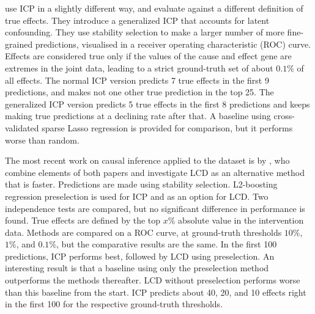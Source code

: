 \textbf{\citet{meinshausen2016methods}} use ICP in a slightly different way, and evaluate against a different definition of true effects. They introduce a generalized ICP that accounts for latent confounding. They use stability selection\citep{meinshausen2010stability} to make a larger number of more fine-grained predictions, visualised in a receiver operating characteristic (ROC) curve. Effects are considered true only if the values of the cause and effect gene are extremes in the joint data, leading to a strict ground-truth set of about $0.1\%$ of all effects. The normal ICP version predicts 7 true effects in the first 9 predictions, and makes not one other true prediction in the top 25. The generalized ICP version predicts 5 true effects in the first 8 predictions and keeps making true predictions at a declining rate after that. A baseline using cross-validated sparse Lasso regression is provided for comparison, but it performs worse than random.

The most recent work on causal inference applied to the \citet{kemmeren2014large} dataset is by \textbf{\citet{versteeg2019boosting}}, who combine elements of both papers and investigate LCD as an alternative method that is faster. Predictions are made using stability selection. L2-boosting regression preselection is used for ICP and as an option for LCD. Two independence tests are compared, but no significant difference in performance is found. True effects are defined by the top $x\%$ absolute value in the intervention data. Methods are compared on a ROC curve, at ground-truth thresholds $10\%$, $1\%$, and $0.1\%$, but the comparative results are the same. In the first 100 predictions, ICP performs best, followed by LCD using preselection. An interesting result is that a baseline using only the preselection method outperforms the methods thereafter. LCD without preselection performs worse than this baseline from the start. ICP predicts about 40, 20, and 10 effects right in the first 100 for the respective ground-truth thresholds.


